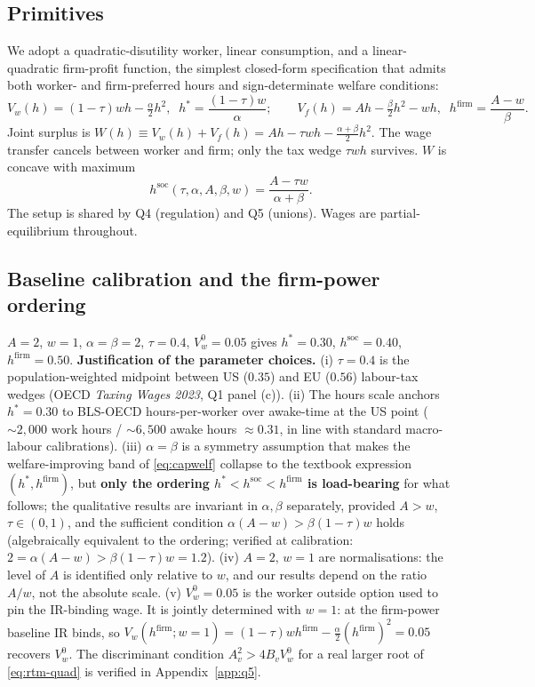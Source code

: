 \documentclass[a4paper,11pt]{article}
\begin{document}
\subsection{Primitives}
We adopt a quadratic-disutility worker, linear consumption, and a linear-quadratic firm-profit function, the simplest closed-form specification that admits both worker- and firm-preferred hours and sign-determinate welfare conditions:
\[
V_w(h)=(1-\tau)wh-\tfrac{\alpha}{2}h^2,\;\; h^*=\frac{(1-\tau)w}{\alpha}; \qquad
V_f(h)=Ah-\tfrac{\beta}{2}h^2-wh,\;\; h^{\mathrm{firm}}=\frac{A-w}{\beta}.
\]
Joint surplus is $W(h)\!\equiv\!V_w(h)+V_f(h)\!=\!Ah-\tau wh-\tfrac{\alpha+\beta}{2}h^2$. The wage transfer cancels between worker and firm; only the tax wedge $\tau wh$ survives. $W$ is concave with maximum
\[
h^{\mathrm{soc}}(\tau,\alpha,A,\beta,w)  = \frac{A-\tau w}{\alpha+\beta}.
\]
The setup is shared by Q4 (regulation) and Q5 (unions). Wages are partial-equilibrium throughout.

\subsection{Baseline calibration and the firm-power ordering}
$A\!=\!2$, $w\!=\!1$, $\alpha\!=\!\beta\!=\!2$, $\tau\!=\!0.4$, $V_w^{0}\!=\!0.05$ gives $h^*\!=\!0.30$, $h^{\mathrm{soc}}\!=\!0.40$, $h^{\mathrm{firm}}\!=\!0.50$. \textbf{Justification of the parameter choices.} (i) $\tau\!=\!0.4$ is the population-weighted midpoint between US ($0.35$) and EU ($0.56$) labour-tax wedges (OECD \emph{Taxing Wages 2023}, Q1 panel (c)). (ii) The hours scale anchors $h^*\!=\!0.30$ to BLS-OECD hours-per-worker over awake-time at the US point ($\sim\!2{,}000$ work hours / $\sim\!6{,}500$ awake hours $\approx\!0.31$, in line with standard macro-labour calibrations). (iii) $\alpha\!=\!\beta$ is a symmetry assumption that makes the welfare-improving band of \eqref{eq:capwelf} collapse to the textbook expression $(h^*,h^{\mathrm{firm}})$, but \textbf{only the ordering $h^*\!<\!h^{\mathrm{soc}}\!<\!h^{\mathrm{firm}}$ is load-bearing} for what follows; the qualitative results are invariant in $\alpha,\beta$ separately, provided $A\!>\!w$, $\tau\!\in\!(0,1)$, and the sufficient condition $\alpha(A-w)>\beta(1-\tau)w$ holds (algebraically equivalent to the ordering; verified at calibration: $2\!=\!\alpha(A-w)>\beta(1-\tau)w\!=\!1.2$). (iv) $A\!=\!2,\,w\!=\!1$ are normalisations: the level of $A$ is identified only relative to $w$, and our results depend on the ratio $A/w$, not the absolute scale. (v) $V_w^{0}\!=\!0.05$ is the worker outside option used to pin the IR-binding wage. It is jointly determined with $w\!=\!1$: at the firm-power baseline IR binds, so $V_w(h^{\mathrm{firm}};w\!=\!1)\!=\!(1-\tau)w h^{\mathrm{firm}}-\tfrac{\alpha}{2}(h^{\mathrm{firm}})^{2}\!=\!0.05$ recovers $V_w^{0}$. The discriminant condition $A_v^{2}\!>\!4B_v V_w^{0}$ for a real larger root of \eqref{eq:rtm-quad} is verified in Appendix~\ref{app:q5}.
\end{document}
